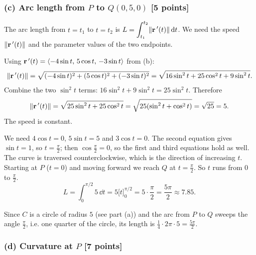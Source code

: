 
\subsubsection*{(c) Arc length from $P$ to $Q(0,5,0)$ [5 points]}

The arc length from $t=t_1$ to $t=t_2$ is $L=\displaystyle\int_{t_1}^{t_2}\lVert\mathbf{r}\,'(t)\rVert\,\mathrm{d} t$.
We need the speed $\lVert\mathbf{r}\,'(t)\rVert$ and the parameter values of the two endpoints.

 Using $\mathbf{r}\,'(t)=\left\langle -4\sin t,\,5\cos t,\,-3\sin t \right\rangle$ from (b):
\[
  \lVert\mathbf{r}\,'(t)\rVert=\sqrt{(-4\sin t)^2+(5\cos t)^2+(-3\sin t)^2}
  =\sqrt{16\sin^2t+25\cos^2t+9\sin^2t}.
\]
Combine the two $\sin^2t$ terms: $16\sin^2t+9\sin^2t=25\sin^2t$. Therefore
\[
  \lVert\mathbf{r}\,'(t)\rVert=\sqrt{25\sin^2t+25\cos^2t}=\sqrt{25(\sin^2t+\cos^2t)}=\sqrt{25}=5 .
\]
The speed is constant.

 We need $4\cos t=0$, $5\sin t=5$ and
$3\cos t=0$. The second equation gives $\sin t=1$, so $t=\frac\pi2$; then
$\cos\frac\pi2=0$, so the first and third equations hold as well.
 The curve is traversed counterclockwise,
which is the direction of increasing $t$. Starting at $P$ ($t=0$) and moving
forward we reach $Q$ at $t=\frac\pi2$. So $t$ runs from $0$ to $\frac\pi2$.
\[
  L=\int_0^{\pi/2}5\,\dd t=5\Big[t\Big]_0^{\pi/2}=5\cdot\frac\pi2=\boxed{\frac{5\pi}{2}}\approx7.85 .
\]

\begin{altmethod}
Since $C$ is a circle of radius $5$ (see part (a)) and the arc from $P$ to $Q$
sweeps the angle $\frac\pi2$, i.e. one quarter of the circle, its length is
$\frac14\cdot2\pi\cdot5=\frac{5\pi}{2}$.
\end{altmethod}


\subsubsection*{(d) Curvature at $P$ [7 points]}

